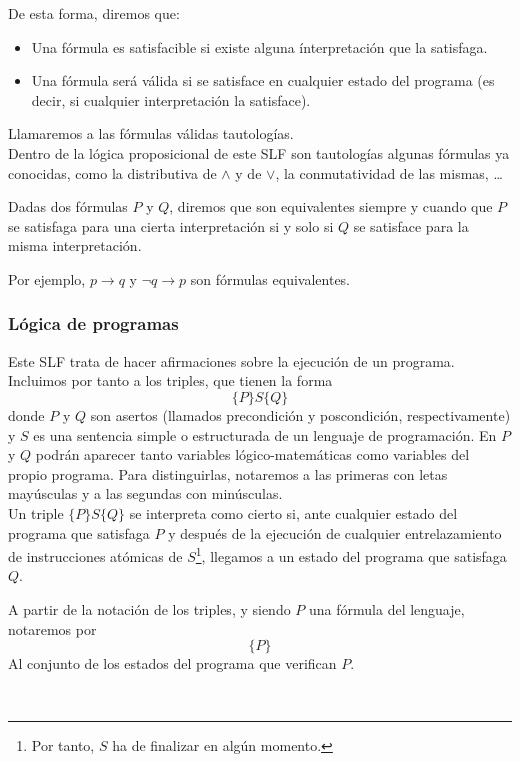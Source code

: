 De esta forma, diremos que:
\begin{itemize}
    \item Una fórmula es satisfacible si existe alguna ínterpretación que la satisfaga.
    \item Una fórmula será válida si se satisface en cualquier estado del programa (es decir, si cualquier interpretación la satisface).
\end{itemize}
Llamaremos a las fórmulas válidas tautologías.\\

Dentro de la lógica proposicional de este SLF son tautologías algunas fórmulas ya conocidas, como la distributiva de $\land$ y de $\lor$, la conmutatividad de las mismas, \ldots

\begin{definicion}
    Dadas dos fórmulas $P$ y $Q$, diremos que son equivalentes siempre y cuando que $P$ se satisfaga para una cierta interpretación si y solo si $Q$ se satisface para la misma interpretación.
\end{definicion}
Por ejemplo, $p\rightarrow q$ y $\lnot q\rightarrow p$ son fórmulas equivalentes.

\subsubsection{Lógica de programas}
Este SLF trata de hacer afirmaciones sobre la ejecución de un programa. Incluimos por tanto a los triples, que tienen la forma
\begin{equation*}
    \{P\}S\{Q\}
\end{equation*}
donde $P$ y $Q$ son asertos (llamados precondición y poscondición, respectivamente) y $S$ es una sentencia simple o estructurada de un lenguaje de programación. En $P$ y $Q$ podrán aparecer tanto variables lógico-matemáticas como variables del propio programa. Para distinguirlas, notaremos a las primeras con letas mayúsculas y a las segundas con minúsculas.\\

Un triple $\{P\}S\{Q\}$ se interpreta como cierto si, ante cualquier estado del programa que satisfaga $P$ y después de la ejecución de cualquier entrelazamiento de instrucciones atómicas de $S$\footnote{Por tanto, $S$ ha de finalizar en algún momento.}, llegamos a un estado del programa que satisfaga $Q$.\\

\begin{notacion}
    A partir de la notación de los triples, y siendo $P$ una fórmula del lenguaje, notaremos por
    \begin{equation*}
        \{P\}
    \end{equation*}
    Al conjunto de los estados del programa que verifican $P$.
\end{notacion}~\\

